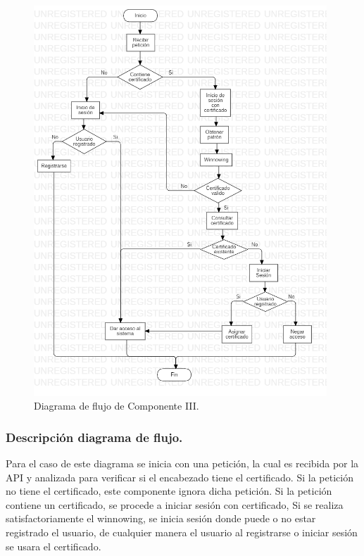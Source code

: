 \documentclass[12pt, a4paper, titlepage]{report}
\begin{document}
                \begin{figure}[H]
                	\begin{center}	\includegraphics[width=11cm]{./imagenes/Disenio/Componente_3/CIII_DF.png}
                	\caption{Diagrama de flujo de Componente III.}
                	\end{center}
        		\end{figure}
        
                \subsubsection{Descripción diagrama de flujo.}
                Para el caso de este diagrama se inicia con una petición, la cual es recibida por la API y analizada para verificar si el encabezado tiene el certificado. Si la petición no tiene el certificado, este componente ignora dicha petición. Si la petición contiene un certificado, se procede a iniciar sesión con certificado,  Si se realiza satisfactoriamente el winnowing, se inicia sesión donde puede o no estar registrado el usuario, de cualquier manera el usuario al registrarse o iniciar sesión se usara el certificado.
        
\end{document}
